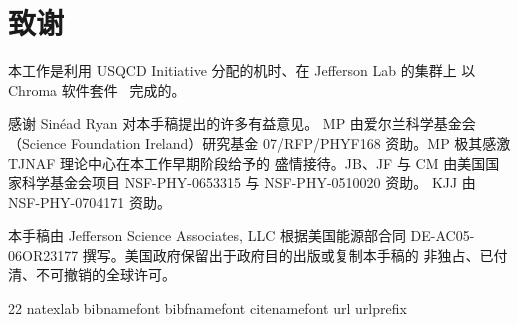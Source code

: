 \section*{致谢}

本工作是利用 USQCD Initiative 分配的机时、在 Jefferson Lab 的集群上
以 Chroma 软件套件~\cite{Edwards:2004sx} 完成的。

感谢 Sin\'ead Ryan 对本手稿提出的许多有益意见。
MP 由爱尔兰科学基金会（Science Foundation Ireland）研究基金
07/RFP/PHYF168 资助。MP 极其感激 TJNAF 理论中心在本工作早期阶段给予的
盛情接待。JB、JF 与 CM 由美国国家科学基金会项目
NSF-PHY-0653315 与 NSF-PHY-0510020 资助。
KJJ 由 NSF-PHY-0704171 资助。

本手稿由 Jefferson Science Associates, LLC 根据美国能源部合同
DE-AC05-06OR23177 撰写。美国政府保留出于政府目的出版或复制本手稿的
非独占、已付清、不可撤销的全球许可。

\begin{thebibliography}{22}
\expandafter\ifx\csname natexlab\endcsname\relax\def\natexlab#1{#1}\fi
\expandafter\ifx\csname bibnamefont\endcsname\relax
  \def\bibnamefont#1{#1}\fi
\expandafter\ifx\csname bibfnamefont\endcsname\relax
  \def\bibfnamefont#1{#1}\fi
\expandafter\ifx\csname citenamefont\endcsname\relax
  \def\citenamefont#1{#1}\fi
\expandafter\ifx\csname url\endcsname\relax
  \def\url#1{\texttt{#1}}\fi
\expandafter\ifx\csname urlprefix\endcsname\relax\def\urlprefix{URL }\fi
\providecommand{\bibinfo}[2]{#2}
\providecommand{\eprint}[2][]{\url{#2}}

\end{thebibliography}
